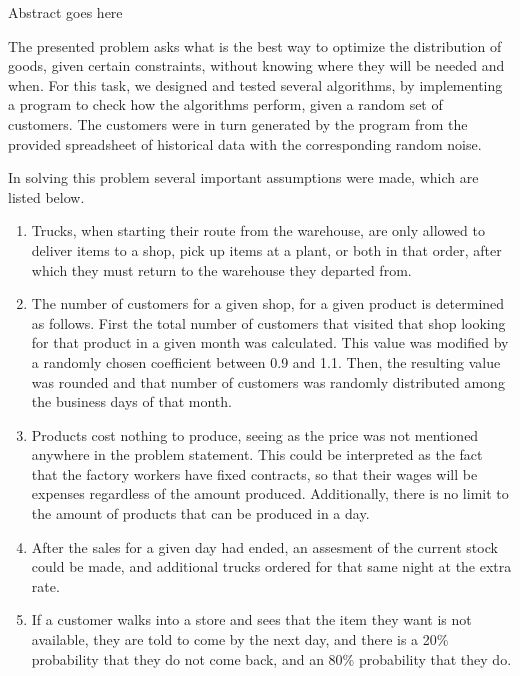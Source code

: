 
\physics

\begin{paperabs}
Abstract goes here
\end{paperabs}
\begin{paper}

The presented problem asks what is the best way to optimize the distribution of
goods, given certain constraints, without knowing where they will be needed and
when.
For this task, we designed and tested several algorithms, by implementing a
program to check how the algorithms perform, given a random set of customers.
The customers were in turn generated by the program from the provided
spreadsheet of historical data with the corresponding random noise.

In solving this problem several important assumptions were made, which are
listed below.
\begin{enumerate}
\item
Trucks, when starting their route from the warehouse, are only allowed to
deliver items to a shop, pick up items at a plant, or both in that order, after
which they must return to the warehouse they departed from.
\item
The number of customers for a given shop, for a given product is determined
as follows.
First the total number of customers that visited that shop looking for that
product in a given month was calculated.
This value was modified by a randomly chosen coefficient between 0.9 and 1.1.
Then, the resulting value was rounded and that number of customers was randomly
distributed among the business days of that month.
\item
Products cost nothing to produce, seeing as the price was
not mentioned anywhere in the problem statement.
This could be interpreted as the fact that the factory workers have fixed
contracts, so that their wages will be expenses regardless of the amount
produced.
Additionally, there is no limit to the amount of products that can be produced
in a day.
\item
After the sales for a given day had ended, an assesment of the current stock
could be made, and additional trucks ordered for that same night at the extra
rate.
\item
If a customer walks into a store and sees that the item they want is not
available, they are told to come by the next day, and there is a 20\%
probability that they do not come back, and an 80\% probability that they do.
\end{enumerate}


\end{paper}
